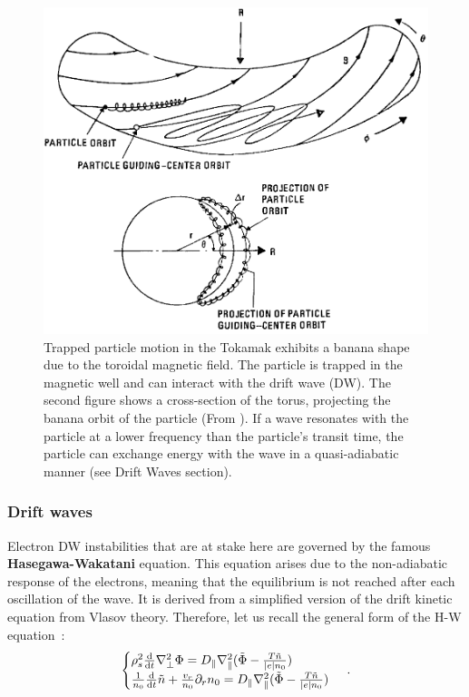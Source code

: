 \documentclass[11pt,openany]{report}
\begin{document}
\begin{multicols}{2}

    \begin{figure}[H]
        \centering
        \includegraphics[width=1\linewidth]{./figures/banana.png}
        \caption{Trapped particle motion in the Tokamak exhibits a banana shape due to the toroidal magnetic field. The particle is trapped in the magnetic well and can interact with the drift wave (DW). The second figure shows a cross-section of the torus, projecting the banana orbit of the particle (From \cite{book_banana, Banana_distr_runaway}). If a wave resonates with the particle at a lower frequency than the particle's transit time, the particle can exchange energy with the wave in a quasi-adiabatic manner (see Drift Waves section).}
        \label{}
    \end{figure}


    \subsubsection{Drift waves}
    Electron DW instabilities that are at stake here are governed by the famous \textbf{Hasegawa-Wakatani} \cite{Hasegawa,Wakatani} equation. This equation arises due to the non-adiabatic response of the electrons, meaning that the equilibrium is not reached after each oscillation of the wave. It is derived from a simplified version of the drift kinetic equation from Vlasov theory. Therefore, let us recall the general form of the H-W equation~:
    \begin{equation}
        \begin{cases}
            \rho_s^2
            \dv{t}\nabla_\perp^2 \Phi= D_\parallel\nabla_\parallel^2(\tilde{\Phi} - \frac{T\tilde{n}}{|e|n_0}) \\
            \frac{1}{n_0}\dv{t}\tilde{n} + \frac{v_r}{n_0}\partial_r n_0 = D_\parallel\nabla_\parallel^2(\tilde{\Phi} - \frac{T\tilde{n}}{|e|n_0})
        \end{cases}\,.
    \end{equation}


\end{multicols}
\end{document}
